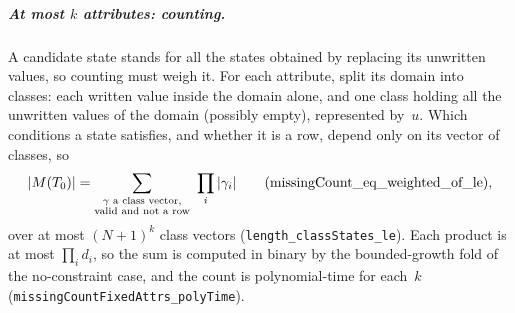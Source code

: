 \documentclass[pdflatex,sn-mathphys-num]{sn-jnl}
\theoremstyle{thmstyleone}
\theoremstyle{thmstylethree}
\begin{document}
\subparagraph*{At most $k$ attributes: counting.}
A candidate state stands for all the states obtained by replacing its unwritten values, so
counting must weigh it. For each attribute, split its domain into classes: each written value
inside the domain alone, and one class holding all the unwritten values of the domain (possibly
empty), represented by~$u$. Which
conditions a state satisfies, and whether it is a row, depend only on its vector of classes, so
\[
|M(T_0)| = \sum_{\substack{\gamma \text{ a class vector,}\\ \text{valid and not a row}}}\
\prod_{i} |\gamma_i|
\qquad (\text{\lstinline{missingCount_eq_weighted_of_le}}),
\]
over at most $(N+1)^k$ class vectors (\lstinline{length_classStates_le}). Each product is at most
$\prod_i d_i$, so the sum is computed in binary by the bounded-growth fold of the
no-constraint case, and the count is polynomial-time for each~$k$
(\lstinline{missingCountFixedAttrs_polyTime}).
\end{document}
